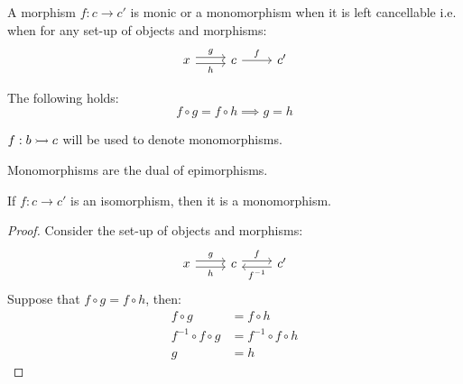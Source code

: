 \begin{definition}
  A morphism $f:c\to c'$ is monic or a monomorphism when it is left
  cancellable \parencite{lane:working_mathematician} i.e. when for any
  set-up of objects and morphisms:
  \[\begin{tikzcd}[ampersand replacement=\&]
    x \& c \& {c'}
    \arrow["f", from=1-2, to=1-3]
    \arrow["g", shift left=1, from=1-1, to=1-2]
    \arrow["h"', shift right=1, from=1-1, to=1-2]
  \end{tikzcd}\]

  The following holds:
  \[f \circ g = f \circ h \implies g = h\]
\end{definition}

\begin{remark}
  $f:b\rightarrowtail c$ will be used to denote monomorphisms.
\end{remark}

\begin{remark}
  Monomorphisms are the dual of epimorphisms.
\end{remark}

\begin{theorem}
  If $f:c\to c'$ is an isomorphism, then it is a monomorphism.

  \begin{proof}
    Consider the set-up of objects and morphisms:
    \[\begin{tikzcd}[ampersand replacement=\&]
      x \& c \& {c'}
      \arrow["f", shift left=1, from=1-2, to=1-3]
      \arrow["g", shift left=1, from=1-1, to=1-2]
      \arrow["h"', shift right=1, from=1-1, to=1-2]
      \arrow["{f^{-1}}", shift left=1, from=1-3, to=1-2]
    \end{tikzcd}\]
    Suppose that $f\circ g = f\circ h$, then:
    \[
      \begin{aligned}
        f\circ g &= f\circ h\\
        f^{-1}\circ f\circ g &= f^{-1}\circ f\circ h\\
        g &= h
      \end{aligned}
    \]
  \end{proof}
\end{theorem}

